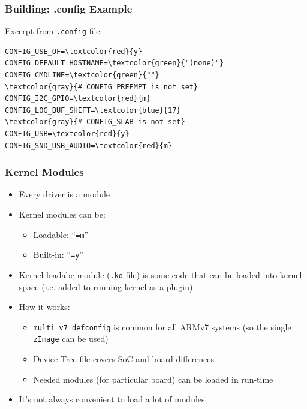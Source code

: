 \documentclass[aspectratio=169]{beamer}
\begin{document}
\begin{frame}[fragile]
  \frametitle{Building: .config Example}
  Excerpt from \texttt{.config} file:
  \begin{Verbatim}[commandchars=\\\{\}]
CONFIG_USE_OF=\textcolor{red}{y}
CONFIG_DEFAULT_HOSTNAME=\textcolor{green}{"(none)"}
CONFIG_CMDLINE=\textcolor{green}{""}
\textcolor{gray}{# CONFIG_PREEMPT is not set}
CONFIG_I2C_GPIO=\textcolor{red}{m}
CONFIG_LOG_BUF_SHIFT=\textcolor{blue}{17}
\textcolor{gray}{# CONFIG_SLAB is not set}
CONFIG_USB=\textcolor{red}{y}
CONFIG_SND_USB_AUDIO=\textcolor{red}{m}
  \end{Verbatim}
\end{frame}

\begin{frame}
  \frametitle{Kernel Modules}
  \begin{itemize}
    \item Every driver is a module
    \item Kernel modules can be:
    \begin{itemize}
      \item Loadable: ``\texttt{=m}''
      \item Built-in: ``\texttt{=y}''
    \end{itemize}
    \item Kernel loadabe module (\texttt{.ko} file) is some code that can be
          loaded into kernel space (i.e. added to running kernel as a plugin)
    \pause
    \item How it works:
    \begin{itemize}
      \item \texttt{multi\_v7\_defconfig} is common for all ARMv7 systems (so
            the single \texttt{zImage} can be used)
      \item Device Tree file covers SoC and board differences
      \item Needed modules (for particular board) can be loaded in run-time
    \end{itemize}
    \item It's not always convenient to load a lot of modules
  \end{itemize}
\end{frame}
\end{document}
